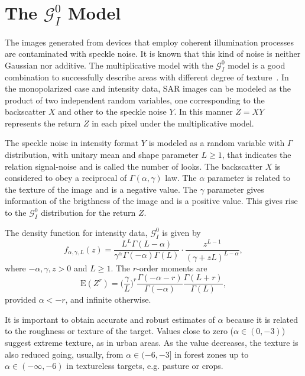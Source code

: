 \documentclass[journal]{IEEEtran}
\numberwithin{equation}{section}
\begin{document}
\section{The $\mathcal{G}_I^0$ Model}
\label{sec_SAR}
The images generated from devices that employ coherent illumination processes are contaminated with speckle noise. It is known that this kind of noise is neither Gaussian nor additive. The multiplicative model with the $\mathcal{G}_I^{0}$ model is a good combination to successfully describe areas with different degree of texture~\cite{Frery97,MejailJacoboFreryBustos:IJRS}. In the monopolarized case and intensity data, SAR images can be modeled as the product of two independent random variables, one corresponding to the backscatter $X$ and other to the speckle noise $Y$. In this manner $Z=X Y  $ represents the return $Z$ in each pixel under the multiplicative model.

The speckle noise in intensity format $Y$ is modeled as a random variable with $\Gamma $ distribution, with unitary mean and shape parameter $L\geq1$, that indicates the relation signal-noise and is called the number of looks. The backscatter $X$ is considered to obey a reciprocal of $\Gamma(\alpha,\gamma) $ law. The $\alpha$ parameter is related to the texture of the image and is a negative value. The $\gamma$ parameter gives information of the brigthness of the image and is a positive value. This gives rise to the $\mathcal{G}_I^{0}$ distribution for the return $Z$.

The density function for intensity data, $\mathcal{G}_I^{0}$ is given by
\begin{equation}
f_{\alpha,\gamma,L}( z) =\frac{L^{L}\Gamma ( L-\alpha
	) }{\gamma ^{\alpha }\Gamma ( -\alpha ) \Gamma (
	L) }\cdot  
\frac{z^{L-1}}{( \gamma +zL) ^{L-\alpha }},%
\label{ec_dens_gI0}
\end{equation}
where $-\alpha,\gamma ,z>0$ and $L\geq 1$. 
The $r$-order moments are
\begin{equation}
\text{E}(Z^r) =\Big(\frac{\gamma}{L}\Big)^r\frac{\Gamma ( -\alpha-r )}{ \Gamma (-\alpha) }
\frac{\Gamma (L+r )}{\Gamma (L)},
\label{moments_gI0}
\end{equation}
provided $\alpha<-r$, and infinite otherwise.

It is important to obtain accurate and robust estimates of $\alpha$ because  it is related to the roughness or texture of the target. 
Values close to zero ($\alpha \in (0,-3)$) suggest extreme texture, as in urban areas. 
As the value decreases, the texture is also reduced going, usually, from $\alpha \in (-6,-3]$ in forest zones up to $\alpha\in(-\infty,-6)$ in textureless targets, e.g. pasture or crops.
\end{document}
